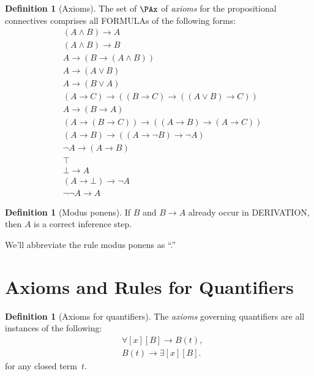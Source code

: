 \documentclass[10pt,a4paper]{article}
\newcommand*{\olup}[1]{\MakeUppercase{#1}}
\theoremstyle{plain}
\theoremstyle{definition}
\newtheorem{defn}[thm]{Definition}
\theoremstyle{remark}
\newcommand*{\olfileid}[3]{}
\newcommand*{\olsection}[1]{\section*{#1}}
\newcommand*{\ollabel}[1]{\label{#1}}
\providecommand{\lif}{\mathbin{\rightarrow}}
\providecommand{\lforall}{\mathord{\forall}}
\providecommand{\lexists}{\mathord{\exists}}
\providecommand{\ltrue}{\top}
\providecommand{\lfalse}{\bot}
\begin{document}
\begin{defn}[Axioms]
The set of $\PAx$ of \emph{axioms} for the propositional connectives comprises
all \olup{formula}s of the following forms:
\begin{align}
  & (A \land B) \lif A \ollabel{ax:land1}\\
  & (A \land B) \lif B \ollabel{ax:land2}\\
  & A \lif (B \lif (A \land B)) \ollabel{ax:land3}\\
  & A \lif (A \lor B) \ollabel{ax:lor1}\\
  & A \lif (B \lor A) \ollabel{ax:lor2}\\
  & (A \lif C) \lif ((B \lif C) \lif ((A \lor B) \lif C)) \ollabel{ax:lor3}\\
  & A \lif (B \lif A) \ollabel{ax:lif1}\\
  & (A \lif (B \lif C)) \lif ((A \lif B) \lif (A \lif C)) \ollabel{ax:lif2}\\
  & (A \lif B) \lif ((A \lif \lnot B) \lif \lnot A) \ollabel{ax:lnot1}\\
  & \lnot A \lif (A \lif B) \ollabel{ax:lnot2}\\
  & \ltrue \ollabel{ax:ltrue}\\
  & \lfalse \lif A \ollabel{ax:lfalse1}\\
  & (A \lif \lfalse) \lif \lnot A \ollabel{ax:lfalse2}\\
  & \lnot\lnot A \lif A \ollabel{ax:dne}
\end{align}
\end{defn}

\begin{defn}[Modus ponens]
  If $B$ and $B \lif A$ already occur in \olup{derivation}, then $A$ is
  a correct inference step.
\end{defn}

We'll abbreviate the rule modus ponens as ``\MP.''





\olfileid{fol}{axd}{qua}

\olsection{Axioms and Rules for Quantifiers}

\begin{defn}[Axioms for quantifiers]
The \emph{axioms} governing quantifiers are
all instances of the following:
\begin{align}
\ollabel{ax:q1} & \lforall[x][B] \lif B(t), \\
\ollabel{ax:q2} & B(t) \lif \lexists[x][B].
\end{align}
for any closed term~$t$.
\end{defn}
\end{document}

